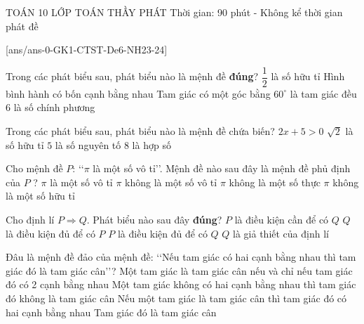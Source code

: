 \begin{name}
	{\tenchude}
	{TOÁN 10}
	{LỚP TOÁN THẦY PHÁT}
	{Thời gian: 90 phút - Không kể thời gian phát đề}
\end{name}
[ans/ans-0-GK1-CTST-De6-NH23-24]
\begin{ex}%
Trong các phát biểu sau, phát biểu nào là mệnh đề \textbf{đúng}?
\choice
{\True $\dfrac{1}{2}$ là số hữu tỉ}
{Hình bình hành có bốn cạnh bằng nhau}
{Tam giác có một góc bằng $60^{\circ}$ là tam giác đều}
{$6$ là số chính phương}
	\loigiai{
	}
\end{ex}

\begin{ex}%
	Trong các phát biểu sau, phát biểu nào là mệnh đề chứa biến?
	\choice
	{\True $2x+5>0$}
	{$\sqrt{2}$ là số hữu tỉ}
	{$5$ là số nguyên tố}
	{$8$ là hợp số}
\end{ex}

\begin{ex}%
Cho mệnh đề $P$: \lq\lq $\pi$ là một số vô tỉ\rq\rq. Mệnh đề nào sau đây là mệnh đề phủ định của $P$ ?
\choice
{$\pi$ là một số vô tỉ}
{\True $\pi$ không là một số vô tỉ}
{$\pi$ không là một số thực}
{$\pi$ không là một số hữu tỉ}
	\loigiai{
	}
\end{ex}

\begin{ex}%
Cho định lí $P \Rightarrow Q$. Phát biểu nào sau đây \textbf{đúng}?
	\choice
{$P$ là điều kiện cần để có $Q$}
{$Q$ là điều kiện đủ để có $P$}
{\True $P$ là điều kiện đủ để có $Q$}
{$Q$ là giả thiết của định lí}
	\loigiai{
	}
\end{ex}

\begin{ex}%
Đâu là mệnh đề đảo của mệnh đề: \lq\lq  Nếu tam giác có hai cạnh bằng nhau thì tam giác đó là tam giác cân\rq\rq ?
\choice
{Một tam giác là tam giác cân nếu và chỉ nếu tam giác đó có 2 cạnh bằng nhau}
{Một tam giác không có hai cạnh bằng nhau thì tam giác đó không là tam giác cân}
{\True Nếu một tam giác là tam giác cân thì tam giác đó có hai cạnh bằng nhau}
{Tam giác đó là tam giác cân}
	\loigiai{
	}
\end{ex}


